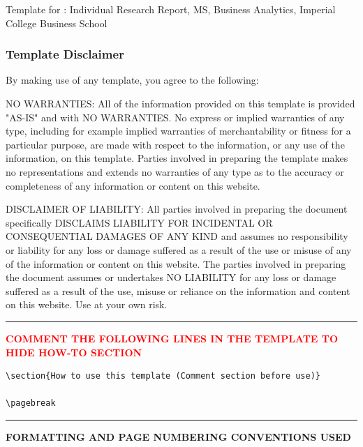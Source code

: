 
Template for : Individual Research Report, MS, Business Analytics, Imperial College Business School

\subsubsection{Template Disclaimer}

By making use of any template, you agree to the following:

NO WARRANTIES: All of the information provided on this template is provided "AS-IS" and with NO WARRANTIES. No express or implied warranties of any type, including for example implied warranties of merchantability or fitness for a particular purpose, are made with respect to the information, or any use of the information, on this template. Parties involved in preparing the template makes no representations and extends no warranties of any type as to the accuracy or completeness of any information or content on this website.


DISCLAIMER OF LIABILITY: All parties involved in preparing the document specifically DISCLAIMS LIABILITY FOR INCIDENTAL OR CONSEQUENTIAL DAMAGES OF ANY KIND and assumes no responsibility or liability for any loss or damage suffered as a result of the use or misuse of any of the information or content on this website. The parties involved in preparing the document assumes or undertakes NO LIABILITY for any loss or damage suffered as a result of the use, misuse or reliance on the information and content on this website. Use at your own risk.

{\color{red} \rule{\linewidth}{0.5mm} }
\textcolor{red}{\textbf{COMMENT THE FOLLOWING LINES IN THE TEMPLATE TO HIDE HOW-TO SECTION}}

\begin{verbatim}
\section{How to use this template (Comment section before use)}

\pagebreak
\end{verbatim}
{\color{red} \rule{\linewidth}{0.5mm}}

\textbf{FORMATTING AND PAGE NUMBERING CONVENTIONS USED}

